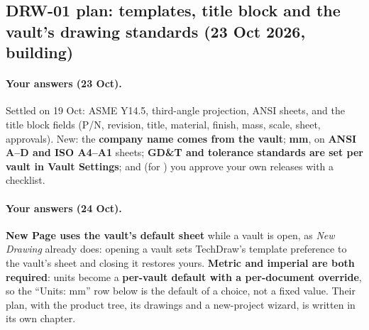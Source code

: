 \subsection{DRW-01 plan: templates, title block and the vault's drawing standards (23 Oct 2026, building)}\label{sec:drw01-plan}

\paragraph{Your answers (23 Oct).} Settled on 19 Oct: ASME Y14.5, third-angle projection, ANSI sheets, and the title
block fields (P/N, revision, title, material, finish, mass, scale, sheet, approvals). New: the \textbf{company name comes
from the vault}; \textbf{mm}, on \textbf{ANSI A--D and ISO A4--A1} sheets; \textbf{GD\&T and tolerance standards are set
per vault in Vault Settings}; and (for ) you approve your own releases with a checklist.

\paragraph{Your answers (24 Oct).} \textbf{New Page uses the vault's default sheet} while a vault is open, as
\emph{New Drawing} already does: opening a vault sets TechDraw's template preference to the vault's sheet and closing it
restores yours. \textbf{Metric and imperial are both required}: units become a \textbf{per-vault default with a
per-document override}, so the ``Units: mm'' row below is the default of a choice, not a fixed value. Their plan, with
the product tree, its drawings and a new-project wizard, is written in its own chapter.

